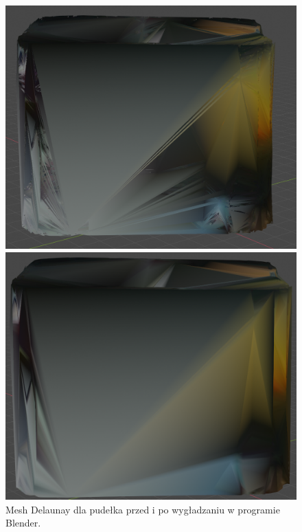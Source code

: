 \begin{figure}[H]
\centering
    \begin{minipage}[b]{0.45\linewidth}
        \includegraphics[scale=0.20]{delaBlendBoxNiegladkie.PNG}
    \end{minipage}
\quad
    \begin{minipage}[b]{0.45\linewidth}
        \includegraphics[scale=0.21]{delaBlendBoxgladkie.png}
    \end{minipage}
\caption{Mesh Delaunay dla pudełka przed i po wygładzaniu w programie Blender.}
\label{fig:blenderDela}
\end{figure}
